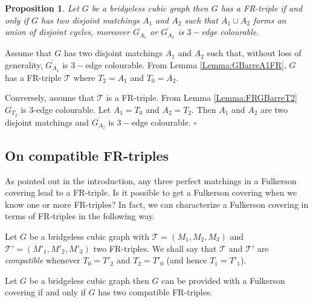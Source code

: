 \documentclass{amsart}
\newtheorem{prop}[thm]{Proposition}
\theoremstyle{definition}
\theoremstyle{remark}
\newenvironment{prf}{{\bf \noindent Proof } }{\hfill$\square$\\}
\begin{document}
\begin{prop} \label{Proposition:EquivalenceStructureFR}
Let $G$ be a bridgeless cubic graph then $G$ has a FR-triple if and
only if $G$ has  two disjoint matchings $A_{1}$ and $A_{2}$ such
that $A_{1} \cup A_{2}$ forms an union of disjoint cycles, moreover $\overline{G_{A_{1}}}$ or $\overline{G_{A_{2}}}$ is $3-$edge
colourable.
\end{prop}
\begin{prf}
Assume that $G$ has  two disjoint matchings $A_{1}$ and $A_{2}$ such
that, without loss of generality, $\overline{G_{A_{1}}}$ is $3-$edge
colourable. From Lemma \ref{Lemma:GBarreA1FR}, $G$ has a FR-triple
$\mathcal T$ where $T_{2}=A_{1}$ and $T_{0}=A_{2}$.


Conversely, assume that $\mathcal T$ is a FR-triple. From Lemma
\ref{Lemma:FRGBarreT2} $\overline{G_{T_{2}}}$ is $3$-edge
colourable.  Let $A_{1}=T_{0}$ and $A_{2}=T_{2}$. Then $A_{1}$ and $
A_{2}$ are two disjoint matchings and $\overline{G_{A_{2}}}$ is
$3-$edge colourable.
\end{prf}

\subsection{On compatible FR-triples}
As pointed out in the introduction, any three perfect matchings in a
Fulkerson covering lead to a FR-triple. Is it possible to get a
Fulkerson covering when we know one or more FR-triples?   In fact,
we can characterize a Fulkerson covering in terms of FR-triples in
the following way.

Let $G$ be a bridgeless cubic graph with $\mathcal T=(M_{1},
M_{2},M_{3})$ and $\mathcal T'=(M'_{1}, M'_{2},M'_{3})$ two
FR-triples. We shall say that $\mathcal T$ and $\mathcal T'$ are
{\em compatible} whenever $T_{0}=T'_{2}$ and $T_{2}=T'_{0}$ (and
hence  $T_{1}=T'_{1}$).


\begin{thm}\label{Theorem:CompatibleFRTriples}
Let $G$ be a bridgeless cubic graph then $G$ can be provided with a
Fulkerson covering if and only if $G$ has  two compatible
FR-triples.
\end{thm}
\end{document}
